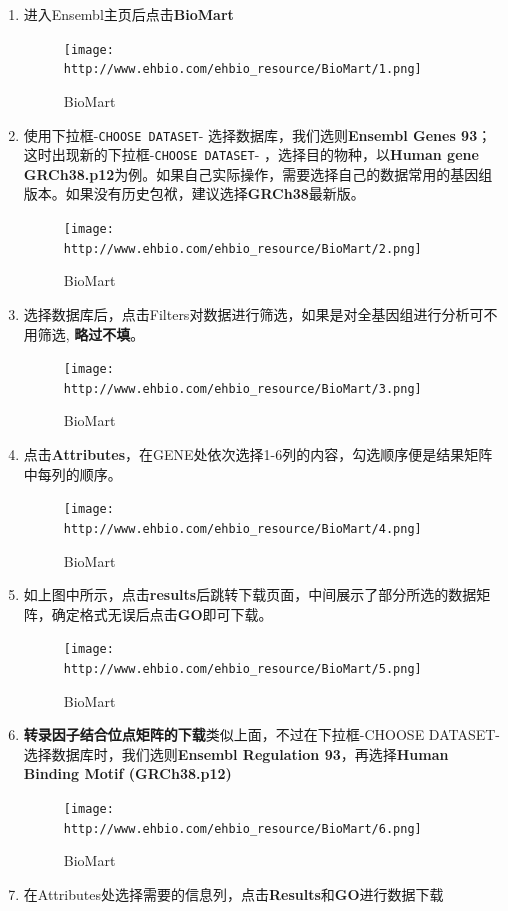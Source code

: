 \documentclass[]{article}
\numberwithin{figure}{section}
\numberwithin{table}{section}
\begin{document}
\begin{enumerate}
\def\labelenumi{\arabic{enumi}.}
\item
  进入Ensembl主页后点击\textbf{BioMart}

  \begin{figure}
  \centering
  \texttt{[image: http://www.ehbio.com/ehbio\_resource/BioMart/1.png]}
  \caption{BioMart}
  \end{figure}
\item
  使用下拉框-\texttt{CHOOSE\ DATASET}- 选择数据库，我们选则\textbf{Ensembl Genes 93}；这时出现新的下拉框-\texttt{CHOOSE\ DATASET}- ，选择目的物种，以\textbf{Human gene GRCh38.p12}为例。如果自己实际操作，需要选择自己的数据常用的基因组版本。如果没有历史包袱，建议选择\textbf{GRCh38}最新版。

  \begin{figure}
  \centering
  \texttt{[image: http://www.ehbio.com/ehbio\_resource/BioMart/2.png]}
  \caption{BioMart}
  \end{figure}
\item
  选择数据库后，点击Filters对数据进行筛选，如果是对全基因组进行分析可不用筛选, \textbf{略过不填}。

  \begin{figure}
  \centering
  \texttt{[image: http://www.ehbio.com/ehbio\_resource/BioMart/3.png]}
  \caption{BioMart}
  \end{figure}
\item
  点击\textbf{Attributes}，在GENE处依次选择1-6列的内容，勾选顺序便是结果矩阵中每列的顺序。

  \begin{figure}
  \centering
  \texttt{[image: http://www.ehbio.com/ehbio\_resource/BioMart/4.png]}
  \caption{BioMart}
  \end{figure}
\item
  如上图中所示，点击\textbf{results}后跳转下载页面，中间展示了部分所选的数据矩阵，确定格式无误后点击\textbf{GO}即可下载。

  \begin{figure}
  \centering
  \texttt{[image: http://www.ehbio.com/ehbio\_resource/BioMart/5.png]}
  \caption{BioMart}
  \end{figure}
\item
  \textbf{转录因子结合位点矩阵的下载}类似上面，不过在下拉框-CHOOSE DATASET- 选择数据库时，我们选则\textbf{Ensembl Regulation 93}，再选择\textbf{Human Binding Motif (GRCh38.p12) }

  \begin{figure}
  \centering
  \texttt{[image: http://www.ehbio.com/ehbio\_resource/BioMart/6.png]}
  \caption{BioMart}
  \end{figure}
\item
  在Attributes处选择需要的信息列，点击\textbf{Results}和\textbf{GO}进行数据下载


\end{enumerate}
\end{document}
